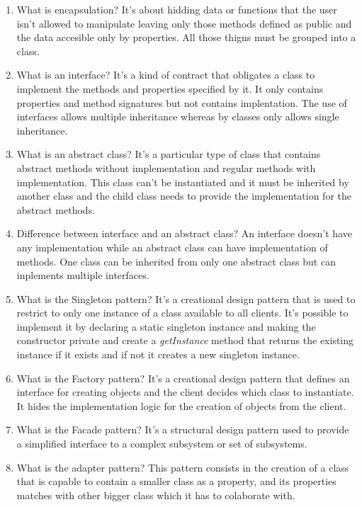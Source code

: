 \begin{multicols}{2}
\begin{enumerate}
\item What is encapsulation? It's about hidding data or functions that the user isn't allowed to manipulate leaving only those methods defined as public and the data accesible only by properties. All those thigns must be grouped into a class.

\item What is an interface? It's a kind of contract that obligates a class to implement the methods and properties specified by it. It only contains properties and method signatures but not contains implentation. The use of interfaces allows multiple inheritance whereas by classes only allows single inheritance.

\item What is an abstract class? It's a particular type of class that contains abstract methods without implementation and regular methods with implementation. This class can't be instantiated and it must be inherited by another class and the child class needs to provide the implementation for the abstract methods.

\item Difference between interface and an abstract class? An interface doesn't have any implementation while an abstract class can have implementation of methods. One class can be inherited from only one abstract class but can inplements multiple interfaces.

\item What is the Singleton pattern? It's a creational design pattern that is used to restrict to only one instance of a class available to all clients. It's possible to implement it by declaring a static singleton instance and making the constructor private and create a \emph{getInstance} method that returns the existing instance if it exists and if not it creates a new singleton instance.

\item What is the Factory pattern? It's a creational design pattern that defines an interface for creating objects and the client decides which class to instantiate. It hides the implementation logic for the creation of objects from the client.

\item What is the Facade pattern? It's a structural design pattern used to provide a simplified interface to a complex subsystem or set of subsystems.

\item What is the adapter pattern? This pattern consists in the creation of a class that is capable to contain a smaller class as a property, and its properties matches with other bigger class which it has to colaborate with.


\end{enumerate}
\end{multicols}
